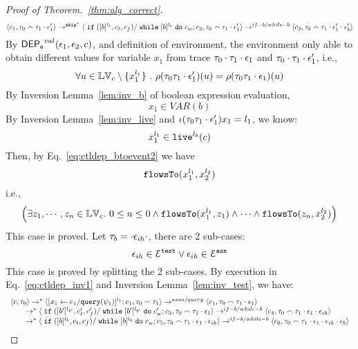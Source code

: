 \begin{proof}[Proof of Theorem.~\ref{thm:alg_correct}]
%
 \[
  \langle c_1, \mathtt{\tau}_0 \smallfrown \mathtt{\tau}_1 \cdot \mathtt{\epsilon}_1' \rangle 
  \rightarrow^{\mathtt{skip}^*} 
  \langle 
  \;\mathtt{if}\;([b]{}^{l_b}, c_t, c_f) / \;\mathtt{while}\; [b]{}^{l_b} \;\mathtt{do}\; c_w; {c}_2, 
  \mathtt{\tau}_0 \smallfrown \mathtt{\tau}_1 \cdot \mathtt{\epsilon}_1' \rangle 
  \rightarrow^{if-b / while-b} 
  \langle {c}_2,  \mathtt{\tau}_0 \smallfrown \mathtt{\tau}_1 \cdot \mathtt{\epsilon}_1' \cdot \mathtt{\epsilon}_b' \rangle 
 \]
By $\mathsf{DEP_{\mathtt{e}}}^{val}(\mathtt{\epsilon}_1, \mathtt{\epsilon}_2, c)$, and definition of environment, 
the environment only able to obtain different values for variable $x_1$ 
from trace $\mathtt{\tau}_0 \cdot \mathtt{\tau}_1 \cdot \mathtt{\epsilon}_1$ and 
$\mathtt{\tau}_0 \cdot \mathtt{\tau}_1 \cdot \mathtt{\epsilon}_1'$, i.e.,
\[
  \forall u \in \mathbb{LV}_c \setminus \{x_1^{l_1}\} ~.~
  \rho(\mathtt{\tau}_0 \mathtt{\tau}_1 \cdot \mathtt{\epsilon}_1') (u) =  
  \rho(\mathtt{\tau}_0 \mathtt{\tau}_1 \cdot \mathtt{\epsilon}_1) (u)
\]
%
By {Inversion Lemma~\ref{lem:inv_b}} of boolean expression evaluation,
 \[
  x_1 \in VAR(b)
 \]
 By Inversion Lemma~\ref{lem:inv_live} and $\iota(\mathtt{\tau}_0 \mathtt{\tau}_1 \cdot \mathtt{\epsilon}_1') x_1 = l_1$, we know:
\[
  x_1^{l_1} \in \mathtt{live}^{l_b}(c)
\]
 Then, by Eq.~\ref{eq:ctldep_btoevent2} we have
 \[
 \mathtt{flowsTo}(x_1^{l_1}, x_2^{l_2})
 \]
 i.e.,
 \[
 \Big( \exists z_1, \cdots, z_n \in \mathbb{LV}_{{c}}. ~ 0 \leq n \leq 0 \land
  \mathtt{flowsTo}(x_1^{l_1}, z_1) 
  \land \cdots \land \mathtt{flowsTo}(z_n, x_2^{l_2}) \Big)
 \]
 This case is proved.
%
 Let $\mathtt{\tau}_b = \cdot \mathtt{\epsilon}_{ih} \cdot$, there are 2 sub-cases: 
 \[
 \mathtt{\epsilon}_{ih} \in \mathcal{E}^{\mathtt{{test}}} \lor \mathtt{\epsilon}_{ih} \in \mathcal{E}^{\mathtt{{asn}}}
 \]
 This case is proved by splitting the 2 sub-cases.
By execution in Eq.~\ref{eq:ctldep_inv1} and {Inversion Lemma~\ref{lem:inv_test}}, we have:
%
\[
  \begin{array}{l}   
  \langle {c}, \mathtt{\tau}_0 \rangle 
  \rightarrow^{*} 
  \langle [\mathrel{ {x}_1 \leftarrow e_1 / {\tt query}(\psi_1) }]^{l_1} ; {c}_1, \mathtt{\tau}_0 \smallfrown \mathtt{\tau}_1 \rangle  
  \rightarrow^{assn/query}
  \langle c_1, \mathtt{\tau}_0 \smallfrown \mathtt{\tau}_1 \cdot \mathtt{\epsilon}_1 \rangle 
  \\ 
  \qquad \rightarrow^{*} 
  \langle \;\mathtt{if}\;([b']{}^{l_{b'}}, c_t', c_f') / \;\mathtt{while}\; [b']{}^{l_{b'}} \;\mathtt{do}\; c_w'; {c}_3, 
  \mathtt{\tau}_0 \smallfrown \mathtt{\tau}_1 \cdot \mathtt{\epsilon}_1 \rangle 
  \rightarrow^{if-b / while-b} 
  \langle {c}_4,  \mathtt{\tau}_0 \smallfrown \mathtt{\tau}_1 \cdot \mathtt{\epsilon}_1 \cdot \mathtt{\epsilon}_{ih} \rangle 
  \\ 
  \qquad \rightarrow^{*} 
  \langle \;\mathtt{if}\;([b]{}^{l_b}, c_t, c_f) / \;\mathtt{while}\; [b]{}^{l_b} \;\mathtt{do}\; c_w; {c}_5, 
  \mathtt{\tau}_0 \smallfrown \mathtt{\tau}_1 \cdot \mathtt{\epsilon}_1\cdot \mathtt{\epsilon}_{ih} \rangle 
  \rightarrow^{if-b / while-b} 
  \langle {c}_6,  \mathtt{\tau}_0 \smallfrown \mathtt{\tau}_1 \cdot \mathtt{\epsilon}_1 \cdot \mathtt{\epsilon}_{ih} \cdot \mathtt{\epsilon}_b \rangle 

\end{array}\]
\end{proof}
